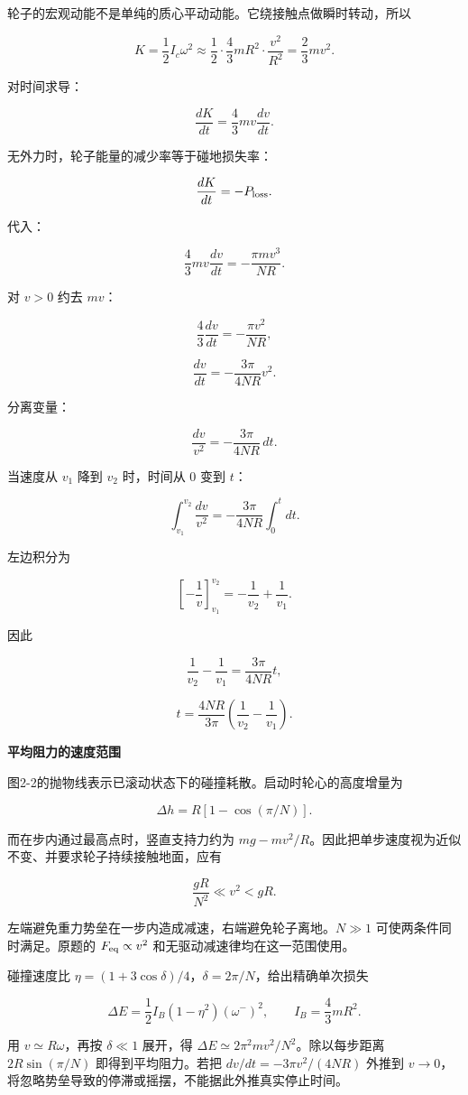 \documentclass[12pt,a4paper,UTF8]{ctexart}
\begin{document}
轮子的宏观动能不是单纯的质心平动动能。它绕接触点做瞬时转动，所以

\[K=\frac12I_c\omega^2
\approx\frac12\cdot\frac43mR^2\cdot\frac{v^2}{R^2}
=\frac23mv^2.\]

对时间求导：

\[\frac{dK}{dt}=\frac43mv\frac{dv}{dt}.\]

无外力时，轮子能量的减少率等于碰地损失率：

\[\frac{dK}{dt}=-P_{\rm loss}.\]

代入：

\[\frac43mv\frac{dv}{dt}
=-\frac{\pi mv^3}{NR}.\]

对 \(v>0\) 约去 \(mv\)：

\[\frac43\frac{dv}{dt}=-\frac{\pi v^2}{NR},\]

\[\frac{dv}{dt}=-\frac{3\pi}{4NR}v^2.\]

分离变量：

\[\frac{dv}{v^2}=-\frac{3\pi}{4NR}\,dt.\]

当速度从 \(v_1\) 降到 \(v_2\) 时，时间从 \(0\) 变到 \(t\)：

\[\int_{v_1}^{v_2}\frac{dv}{v^2}
=-\frac{3\pi}{4NR}\int_0^t dt.\]

左边积分为

\[\left[-\frac1v\right]_{v_1}^{v_2}
=-\frac1{v_2}+\frac1{v_1}.\]

因此

\[\frac1{v_2}-\frac1{v_1}=\frac{3\pi}{4NR}t,\]

\[\boxed{t=\frac{4NR}{3\pi}
\left(\frac1{v_2}-\frac1{v_1}\right)}.\]

\textbf{平均阻力的速度范围}

图2-2的抛物线表示已滚动状态下的碰撞耗散。启动时轮心的高度增量为

\[\Delta h=R[1-\cos(\pi/N)].\]

而在步内通过最高点时，竖直支持力约为
\(mg-mv^2/R\)。因此把单步速度视为近似不变、并要求轮子持续接触地面，应有

\[\frac{gR}{N^2}\ll v^2<gR.\]

左端避免重力势垒在一步内造成减速，右端避免轮子离地。\(N\gg1\)
可使两条件同时满足。原题的 \(F_{\rm eq}\propto v^2\)
和无驱动减速律均在这一范围使用。

碰撞速度比
\(\eta=(1+3\cos\delta)/4\)，\(\delta=2\pi/N\)，给出精确单次损失

\[\Delta E=\frac12 I_B(1-\eta^2)(\omega^-)^2,
\qquad I_B=\frac43mR^2.\]

用 \(v\simeq R\omega\)，再按 \(\delta\ll1\) 展开，得
\(\Delta E\simeq2\pi^2mv^2/N^2\)。除以每步距离 \(2R\sin(\pi/N)\)
即得到平均阻力。若把 \(dv/dt=-3\pi v^2/(4NR)\) 外推到
\(v\to0\)，将忽略势垒导致的停滞或摇摆，不能据此外推真实停止时间。
\end{document}
